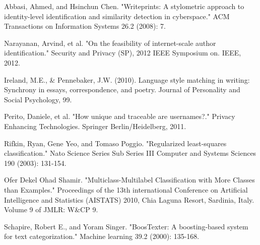 \documentclass[10pt, conference, compsocconf]{IEEEtran}
\begin{document}
%
%
%
\begin{thebibliography}{1}

Abbasi, Ahmed, and Hsinchun Chen. "Writeprints: A stylometric approach to identity-level identification and similarity detection in cyberspace." ACM Transactions on Information Systems 26.2 (2008): 7.

Narayanan, Arvind, et al. "On the feasibility of internet-scale author identification." Security and Privacy (SP), 2012 IEEE Symposium on. IEEE, 2012.

Ireland, M.E., \& Pennebaker, J.W. (2010).  Language style matching in writing: Synchrony in essays, correspondence, and poetry.  Journal of Personality and Social Psychology, 99.

Perito, Daniele, et al. "How unique and traceable are usernames?." Privacy Enhancing Technologies. Springer Berlin/Heidelberg, 2011.

Rifkin, Ryan, Gene Yeo, and Tomaso Poggio. "Regularized least-squares classification." Nato Science Series Sub Series III Computer and Systems Sciences 190 (2003): 131-154.

Ofer Dekel Ohad Shamir. "Multiclass-Multilabel Classification with More Classes than Examples." Proceedings of the 13th international Conference on Artificial Intelligence and Statistics (AISTATS) 2010, Chia Laguna Resort, Sardinia, Italy. Volume 9 of JMLR: W\&CP 9.

Schapire, Robert E., and Yoram Singer. "BoosTexter: A boosting-based system for text categorization." Machine learning 39.2 (2000): 135-168.

\end{thebibliography}




\end{document}
